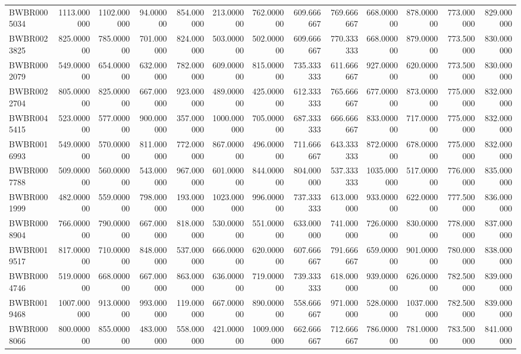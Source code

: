 \begin{longtable}{lrrrrrrrrrrrr}
BWBR0005034 & 1113.000000 & 1102.000000 & 94.000000 & 854.000000 & 213.000000 & 762.000000 & 609.666667 & 769.666667 & 668.000000 & 878.000000 & 773.000000 & 829.000000 \\
BWBR0023825 & 825.000000 & 785.000000 & 701.000000 & 824.000000 & 503.000000 & 502.000000 & 609.666667 & 770.333333 & 668.000000 & 879.000000 & 773.500000 & 830.000000 \\
BWBR0002079 & 549.000000 & 654.000000 & 632.000000 & 782.000000 & 609.000000 & 815.000000 & 735.333333 & 611.666667 & 927.000000 & 620.000000 & 773.500000 & 830.000000 \\
BWBR0022704 & 805.000000 & 825.000000 & 667.000000 & 923.000000 & 489.000000 & 425.000000 & 612.333333 & 765.666667 & 677.000000 & 873.000000 & 775.000000 & 832.000000 \\
BWBR0045415 & 523.000000 & 577.000000 & 900.000000 & 357.000000 & 1000.000000 & 705.000000 & 687.333333 & 666.666667 & 833.000000 & 717.000000 & 775.000000 & 832.000000 \\
BWBR0016993 & 549.000000 & 570.000000 & 811.000000 & 772.000000 & 867.000000 & 496.000000 & 711.666667 & 643.333333 & 872.000000 & 678.000000 & 775.000000 & 832.000000 \\
BWBR0007788 & 509.000000 & 560.000000 & 543.000000 & 967.000000 & 601.000000 & 844.000000 & 804.000000 & 537.333333 & 1035.000000 & 517.000000 & 776.000000 & 835.000000 \\
BWBR0001999 & 482.000000 & 559.000000 & 798.000000 & 193.000000 & 1023.000000 & 996.000000 & 737.333333 & 613.000000 & 933.000000 & 622.000000 & 777.500000 & 836.000000 \\
BWBR0008904 & 766.000000 & 790.000000 & 667.000000 & 818.000000 & 530.000000 & 551.000000 & 633.000000 & 741.000000 & 726.000000 & 830.000000 & 778.000000 & 837.000000 \\
BWBR0019517 & 817.000000 & 710.000000 & 848.000000 & 537.000000 & 666.000000 & 620.000000 & 607.666667 & 791.666667 & 659.000000 & 901.000000 & 780.000000 & 838.000000 \\
BWBR0004746 & 519.000000 & 668.000000 & 667.000000 & 863.000000 & 636.000000 & 719.000000 & 739.333333 & 618.000000 & 939.000000 & 626.000000 & 782.500000 & 839.000000 \\
BWBR0019468 & 1007.000000 & 913.000000 & 993.000000 & 119.000000 & 667.000000 & 890.000000 & 558.666667 & 971.000000 & 528.000000 & 1037.000000 & 782.500000 & 839.000000 \\
BWBR0008066 & 800.000000 & 855.000000 & 483.000000 & 558.000000 & 421.000000 & 1009.000000 & 662.666667 & 712.666667 & 786.000000 & 781.000000 & 783.500000 & 841.000000 \\

\end{longtable}
